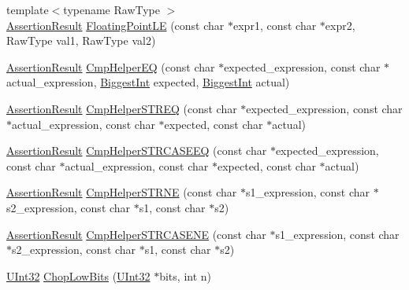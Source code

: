 \begin{DoxyCompactItemize}
\item 
{\footnotesize template$<$typename Raw\-Type $>$ }\\\hyperlink{classtesting_1_1AssertionResult}{\-Assertion\-Result} \hyperlink{namespacetesting_1_1internal_a27094d26e2f0cf4bcf02d6b8e3382f70}{\-Floating\-Point\-L\-E} (const char $\ast$expr1, const char $\ast$expr2, \-Raw\-Type val1, \-Raw\-Type val2)
\item 
\hyperlink{classtesting_1_1AssertionResult}{\-Assertion\-Result} \hyperlink{namespacetesting_1_1internal_ab3ac33c050b73adde43e78111448805f}{\-Cmp\-Helper\-E\-Q} (const char $\ast$expected\-\_\-expression, const char $\ast$actual\-\_\-expression, \hyperlink{namespacetesting_1_1internal_ae8f73370150f905887720532fa9f572e}{\-Biggest\-Int} expected, \hyperlink{namespacetesting_1_1internal_ae8f73370150f905887720532fa9f572e}{\-Biggest\-Int} actual)
\item 
\hyperlink{classtesting_1_1AssertionResult}{\-Assertion\-Result} \hyperlink{namespacetesting_1_1internal_aac3ea8412a9d5f786b992a2b06aeb353}{\-Cmp\-Helper\-S\-T\-R\-E\-Q} (const char $\ast$expected\-\_\-expression, const char $\ast$actual\-\_\-expression, const char $\ast$expected, const char $\ast$actual)
\item 
\hyperlink{classtesting_1_1AssertionResult}{\-Assertion\-Result} \hyperlink{namespacetesting_1_1internal_aa5c3543f39545113a66c5b4d8f829fc6}{\-Cmp\-Helper\-S\-T\-R\-C\-A\-S\-E\-E\-Q} (const char $\ast$expected\-\_\-expression, const char $\ast$actual\-\_\-expression, const char $\ast$expected, const char $\ast$actual)
\item 
\hyperlink{classtesting_1_1AssertionResult}{\-Assertion\-Result} \hyperlink{namespacetesting_1_1internal_a24dfe04b51cda2637868440f0e6a7110}{\-Cmp\-Helper\-S\-T\-R\-N\-E} (const char $\ast$s1\-\_\-expression, const char $\ast$s2\-\_\-expression, const char $\ast$s1, const char $\ast$s2)
\item 
\hyperlink{classtesting_1_1AssertionResult}{\-Assertion\-Result} \hyperlink{namespacetesting_1_1internal_a87ee06a47690ee4681d40e1bf6a4a3c5}{\-Cmp\-Helper\-S\-T\-R\-C\-A\-S\-E\-N\-E} (const char $\ast$s1\-\_\-expression, const char $\ast$s2\-\_\-expression, const char $\ast$s1, const char $\ast$s2)
\item 
\hyperlink{namespacetesting_1_1internal_a03df445d5850459574de6ffb6f57ae95}{\-U\-Int32} \hyperlink{namespacetesting_1_1internal_ae5b8a7eede03981fb212e2a48bccea26}{\-Chop\-Low\-Bits} (\hyperlink{namespacetesting_1_1internal_a03df445d5850459574de6ffb6f57ae95}{\-U\-Int32} $\ast$bits, int n)

\end{DoxyCompactItemize}
